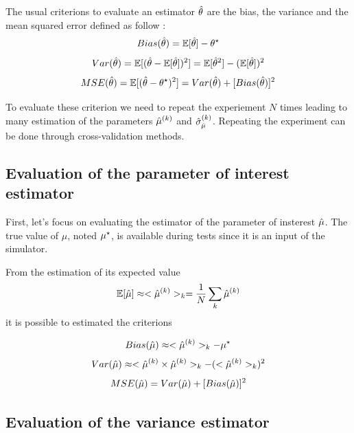 The usual criterions to evaluate an estimator $\hat\theta$ are the bias, the variance and the mean squared error defined as follow :
\begin{equation}
  Bias(\hat\theta) = \mathbb{E}[\hat\theta] - \theta^\star
\end{equation}
\begin{equation}
  Var(\hat\theta) = \mathbb{E}[ (\hat\theta - \mathbb{E}[\hat\theta])^2 ] = \mathbb{E}[\hat\theta^2] - (\mathbb{E}[\hat\theta])^2
\end{equation}
\begin{equation}
  MSE(\hat\theta) = \mathbb{E}[(\hat\theta - \theta^\star)^2] = Var(\hat\theta) + [Bias(\hat\theta)]^2
\end{equation}

To evaluate these criterion we need to repeat the experiement $N$ times leading to many estimation of the parameters $\hat\mu^{(k)}$ and $\hat\sigma_{\hat\mu}^{(k)}$.
Repeating the experiment can be done through cross-validation methods.


\subsection{Evaluation of the parameter of interest estimator} %
\label{sub:evaluation_of_the_parameter_of_interest_estimator}

First, let's focus on evaluating the estimator of the parameter of insterest $\hat\mu$.
The true value of $\mu$, noted $\mu^\star$, is available during tests since it is an input of the simulator.

From the estimation of its expected value
\begin{equation}
  \mathbb{E}[\hat\mu] \approx <\hat\mu^{(k)}>_k = \frac{1}{N} \sum_{k} \hat\mu^{(k)}
\end{equation}
it is possible to estimated the criterions

\begin{equation}
  Bias(\hat\mu) \approx <\hat\mu^{(k)}>_k - \mu^\star
\end{equation}
\begin{equation}
  \label{eq:var_hmu}
  Var(\hat\mu) \approx <\hat\mu^{(k)} \times \hat\mu^{(k)}>_k - (<\hat\mu^{(k)}>_k)^2
\end{equation}
\begin{equation}
  MSE(\hat\mu) = Var(\hat\mu) + [Bias(\hat\mu)]^2
\end{equation}




\subsection{Evaluation of the variance estimator} %
\label{sub:evaluation_of_the_variance_estimator}

